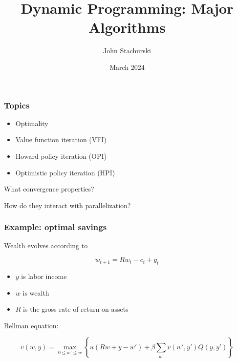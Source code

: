 \documentclass[xcolor=dvipsnames]{beamer}
\date[\today]{}
\title{Dynamic Programming: Major Algorithms}
\author{John Stachurski}
\date{March 2024}
\renewcommand{\leq}{\leqslant}
\renewcommand{\leq}{\leqslant}
\newcommand{\1}{\mathbbm 1}
\begin{document}
\begin{frame}
  \titlepage
\end{frame}



\begin{frame}
    \frametitle{Topics}

    \begin{itemize}
        \item Optimality
        \vspace{0.5em}
        \item Value function iteration (VFI)
        \vspace{0.5em}
        \item Howard policy iteration (OPI)
        \vspace{0.5em}
        \item Optimistic policy iteration (HPI)
    \end{itemize}

        \vspace{0.5em}
        \vspace{0.5em}
        \vspace{0.5em}

    What convergence properties?
        \vspace{0.5em}

    How do they interact with parallelization? 

\end{frame}



\begin{frame}
    \frametitle{Example: optimal savings}
    
     Wealth evolves according to 

     \begin{equation*}
         w_{t+1} = Rw_t - c_t + y_t
     \end{equation*}


    \begin{itemize}
        \item $y$ is labor income
        \item $w$ is wealth
        \item $R$ is the gross rate of return on assets
    \end{itemize}

    Bellman equation:

    \begin{equation*}
        v(w, y) = 
        \max_{0 \leq w' \leq w}
        \left\{
            u(Rw + y - w') 
             + \beta \sum_{w'} v(w', y') Q(y, y')
        \right\}
    \end{equation*}


\end{frame}
\end{document}
